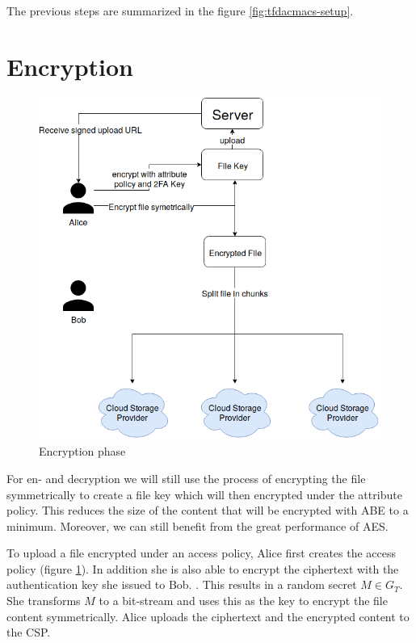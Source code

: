 The previous steps are summarized in the figure \ref{fig:tfdacmacs-setup}.

\section{Encryption}
\begin{figure}[!t]
\centering
    \includegraphics[width=0.7\linewidth]{img/TF-DAC-MACS-overview-encrypt.png}
    \caption{Encryption phase}
    \label{fig:tfdacmacs-encrypt}
\end{figure}

For en- and decryption we will still use the process of encrypting the file symmetrically to create a file key which will then encrypted under the attribute policy. This reduces the size of the content that will be encrypted with ABE to a minimum. Moreover, we can still benefit from the great performance of \ac{AES}. 

To upload a file encrypted under an access policy, Alice first creates the access policy (figure \ref{fig:tfdacmacs-encrypt}). In addition she is also able to encrypt the ciphertext with the authentication key she issued to Bob. . This results in a random secret $M \in G_T$. She transforms $M$ to a bit-stream and uses this as the key to encrypt the file content symmetrically. Alice uploads the ciphertext and the encrypted content to the CSP. 

